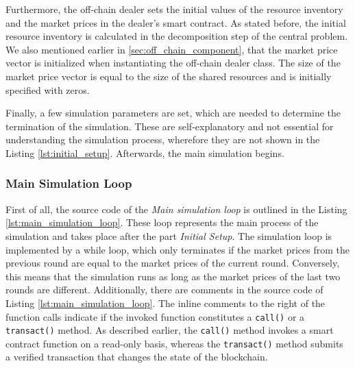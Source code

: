 Furthermore, the off-chain dealer sets the initial values of the resource inventory and the market prices in the dealer's
smart contract. As stated before, the initial resource inventory is calculated in the decomposition step of the central problem. 
We also mentioned earlier in \ref{sec:off_chain_component}, that the market price vector is initialized when instantiating the off-chain dealer class.
The size of the market price vector is equal to the size of the shared resources and is initially specified with zeros.

Finally, a few simulation parameters are set, which are needed to determine the termination of the simulation.
These are self-explanatory and not essential for understanding the simulation process, wherefore they are not shown in the Listing \ref{lst:initial_setup}.
Afterwards, the main simulation begins.

\subsubsection{Main Simulation Loop}
First of all, the source code of the \textit{Main simulation loop} is outlined in the Listing \ref{lst:main_simulation_loop}.
These loop represents the main process of the simulation and takes place after the part \textit{Initial Setup}.
The simulation loop is implemented by a while loop, which only terminates if the 
market prices from the previous round are equal to the market prices of the current round.
Conversely, this means that the simulation runs as long as the market prices of the last two rounds are different.
Additionally, there are comments in the source code of Listing \ref{lst:main_simulation_loop}.
The inline comments to the right of the function calls indicate if the invoked function constitutes
a \verb|call()| or a \verb|transact()| method. As described earlier, the \verb|call()| method invokes 
a smart contract function on a read-only basis, whereas the \verb|transact()| method submits a verified transaction 
that changes the state of the blockchain.

